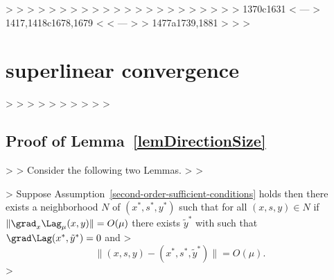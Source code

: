 > %
> %
> %
> %
> %
> %
> %
> %
> %
> %
> %
> %
> %
> %
> %
> %
> %
> %
> %
> %
> %
> 
1370c1631
< %
---
> %
1417,1418c1678,1679
< %
< %
---
> %
> %
1477a1739,1881
> \if{}
> 
> \section{superlinear convergence}\label{app:superlinear-conv}
> 
> 
> 
> 
> 
> 
> 
> 
> 
> \subsection{Proof of Lemma~\ref{lemDirectionSize}}\label{sec:lemDirectionSize}
> 
> Consider the following two Lemmas. 
> 
> \begin{lemma}\label{lem:hager-reformulated}
> Suppose Assumption~\ref{second-order-sufficient-conditions} holds then there exists a neighborhood $N$ of $(x^{*},s^{*},y^{*})$ such that for all $(x,s,y) \in N$  if $ \| \grad_{x} \Lag_{\mu}(x,y) \|  = O(\mu)$ there exists $\tilde{y}^{*}$ with such that $\grad \Lag(x^{*}, \tilde{y}^{*}) = 0$ and 
> $$\| (x,s,y) - (x^{*}, s^{*}, \tilde{y}^{*}) \|  = O( \mu ).$$
> \end{lemma}
